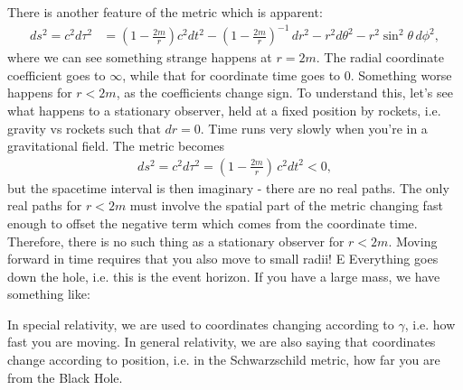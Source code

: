 \documentclass[a4paper, 11pt, normalem]{report}
\begin{document}
There is another feature of the metric which is apparent:
\begin{align}
    ds^2 = c^2d\tau^2 &= \left(1-\frac{2m}{r}\right)c^2dt^2 - \left(1-\frac{2m}{r}\right)^{-1}\,dr^2- r^2d\theta^2 - r^2\sin^2\theta\,d\phi^2,
\end{align}
where we can see something strange happens at $r=2m$.
The radial coordinate coefficient goes to $\infty$, while that for coordinate time goes to $0$.
Something worse happens for $r<2m$, as the coefficients change sign.
To understand this, let's see what happens to a stationary observer, held at a fixed position by rockets, i.e. gravity vs rockets such that $dr=0$.
Time runs very slowly when you're in a gravitational field. 
The metric becomes 
\begin{align}
    ds^2 = c^2d\tau^2 = \left(1-\frac{2m}{r}\right)\,c^2dt^2 < 0,
\end{align}
but the spacetime interval is then imaginary - there are no real paths. 
The only real paths for $r<2m$ must involve the spatial part of the metric changing fast enough to offset the negative term which comes from the coordinate time. 
Therefore, there is no such thing as a stationary observer for $r<2m$.
Moving forward in time requires that you also move to small radii! E
Everything goes down the hole, i.e. this is the event horizon.
If you have a large mass, we have something like:
\begin{figure}[H]
    \centering
\end{figure}
In special relativity, we are used to coordinates changing according to $\gamma$, i.e. how fast you are moving. 
In general relativity, we are also saying that coordinates change according to position, i.e. in the Schwarzschild metric, how far you are from the Black Hole.
\end{document}
